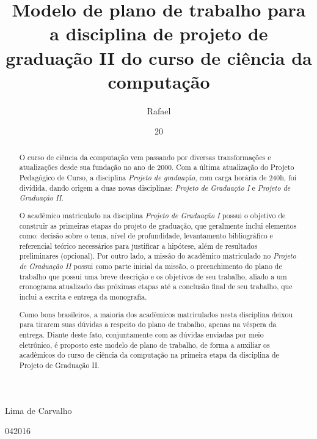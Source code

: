 \documentclass[tcc1,project]{uftex}
\begin{document}
  \title{Modelo de plano de trabalho para a disciplina de projeto de graduação II do curso de ciência da computação}
  \author{Rafael}{Lima de Carvalho}

  \date{20}{04}{2016}

  

  \maketitle

  \begin{abstract}
O curso de ciência da computação vem passando por diversas transformações e atualizações desde sua fundação no ano de 2000. Com a última atualização do Projeto Pedagógico de Curso, a disciplina \textit{Projeto de graduação}, com carga horária de 240h, foi dividida, dando origem a duas novas disciplinas: \textit{Projeto de Graduação I} e \textit{Projeto de Graduação II}. 

O acadêmico matriculado na disciplina \textit{Projeto de Graduação I} possui o objetivo de construir as primeiras etapas do projeto de graduação, que geralmente inclui elementos como: decisão sobre o tema, nível de profundidade, levantamento bibliográfico e referencial teórico necessários para justificar a hipótese, além de resultados preliminares (opcional). Por outro lado, a missão do acadêmico matriculado no \textit{Projeto de Graduação II} possui como parte inicial da missão, o preenchimento do plano de trabalho que possui uma breve descrição e os objetivos de  seu trabalho, aliado a um cronograma atualizado das próximas etapas até a conclusão final de seu trabalho, que inclui a escrita e entrega da monografia.

Como bons brasileiros, a maioria dos acadêmicos matriculados nesta disciplina deixou para tirarem suas dúvidas a respeito do plano de trabalho, apenas na véspera da entrega. Diante deste fato, conjuntamente com as dúvidas enviadas por meio eletrônico, é proposto este modelo de plano de trabalho, de forma a auxiliar os acadêmicos do curso de ciência da computação na primeira etapa da disciplina de Projeto de Graduação II.
  \end{abstract}
\end{document}
